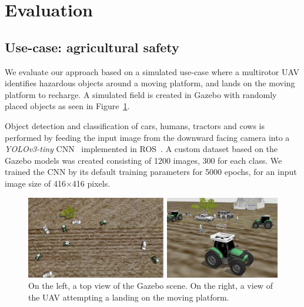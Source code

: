 \documentclass[conference]{IEEEtran}
\begin{document}
\section{Evaluation}
\label{sec:experimental}


\subsection{Use-case: agricultural safety}

We evaluate our approach based on a simulated use-case where a multirotor UAV identifies
hazardous objects around a moving platform, and lands on the
moving platform to recharge. A simulated field is created in Gazebo with randomly placed objects as seen in Figure~\ref{fig:Gazebo}.

Object detection and classification of cars, humans, tractors and cows is performed by feeding the input
image from the downward facing camera into a \emph{YOLOv3-tiny} CNN~\cite{yolov3} implemented in ROS~\cite{bjelonicYolo2018}. 
A custom dataset based on the Gazebo models was created consisting of 1200 images, 300
for each class. We trained the CNN by its default training
parameters for 5000 epochs, for an input image size of \SI{416}{}$\times$\SI{416}{}
pixels.

\begin{figure}[t]
\centering
\includegraphics[scale=0.2]{gazebo_scalled_gamma_corrected.png}
\caption{On the left, a top view of the Gazebo scene. 
On the right, a view of the UAV attempting a landing on the moving platform.}
\label{fig:Gazebo}
\end{figure}
\end{document}
